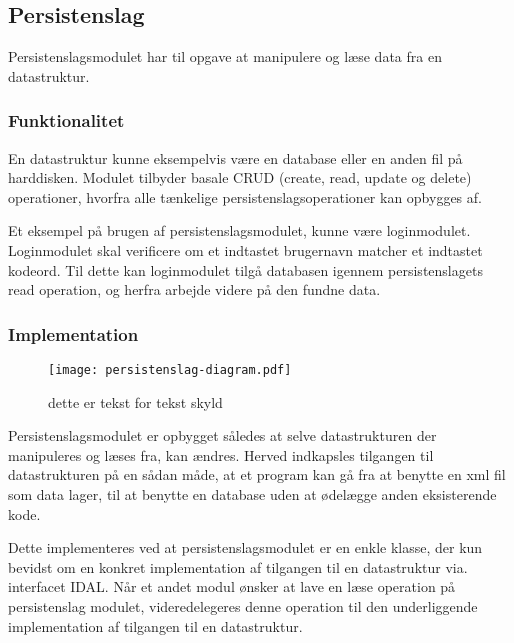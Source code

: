\subsection{Persistenslag}
\label{sub:persistenslag}

Persistenslagsmodulet har til opgave at manipulere og læse data fra en datastruktur.



\subsubsection{Funktionalitet}
\label{ssub:persistenslag_funktionalitet}

En datastruktur kunne eksempelvis være en database eller en anden fil på harddisken. Modulet tilbyder basale CRUD (create, read, update og delete) operationer, hvorfra alle tænkelige persistenslagsoperationer kan opbygges af.

Et eksempel på brugen af persistenslagsmodulet, kunne være loginmodulet. Loginmodulet skal verificere om et indtastet brugernavn matcher et indtastet kodeord. Til dette kan loginmodulet tilgå databasen igennem persistenslagets read operation, og herfra arbejde videre på den fundne data.


\subsubsection{Implementation}
\label{ssub:persistenslag_implementation}
\begin{figure}
  \centering
  \texttt{[image: persistenslag-diagram.pdf]}
  \caption{dette er tekst for tekst skyld }
  \label{fig:permod}
\end{figure}

Persistenslagsmodulet er opbygget således at selve datastrukturen der manipuleres og læses fra, kan ændres. Herved indkapsles tilgangen til datastrukturen på en sådan måde, at et program kan gå fra at benytte en xml fil som data lager, til at benytte en database uden at ødelægge anden eksisterende kode.

Dette implementeres ved at persistenslagsmodulet er en enkle klasse, der kun bevidst om en konkret implementation af tilgangen til en datastruktur via. interfacet IDAL. Når et andet modul ønsker at lave en læse operation på persistenslag modulet, videredelegeres denne operation til den underliggende implementation af tilgangen til en datastruktur.
